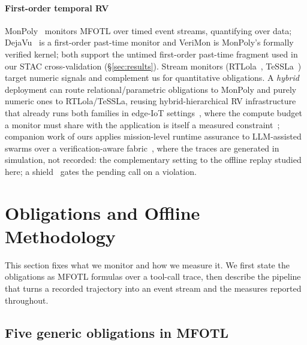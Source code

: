 \documentclass[sigconf]{acmart}
\begin{document}
\paragraph{First-order temporal RV} MonPoly~\cite{monpoly2014} monitors MFOTL over
timed event streams, quantifying over data;
DejaVu~\cite{havelund2018dejavu} is a first-order past-time monitor and VeriMon is
MonPoly's formally verified kernel; both support the untimed first-order past-time
fragment used in our STAC cross-validation (\S\ref{sec:results}).
Stream monitors (RTLola~\cite{rtlola2019}, TeSSLa~\cite{tessla2018}) target numeric
signals and complement us for quantitative obligations. A \emph{hybrid} deployment
can route relational/parametric obligations to MonPoly and purely numeric ones to
RTLola/TeSSLa, reusing hybrid-hierarchical RV infrastructure that already runs both
families in edge-IoT settings~\cite{hybridhier2025,hiermon2026,critisfabric2026}, where
the compute budget a monitor must share with the application is itself a measured
constraint~\cite{v2xedge2026};
companion work of ours applies mission-level runtime assurance to LLM-assisted swarms
over a verification-aware fabric~\cite{mesasswarm2026}, where the traces are generated in
simulation, not recorded: the complementary setting to the offline replay
studied here; a
shield~\cite{shielding2018} gates the pending call on a violation.

\section{Obligations and Offline Methodology}
\label{sec:oblig}

This section fixes what we monitor and how we measure it. We first state the obligations
as MFOTL formulas over a tool-call trace, then describe the pipeline that turns a
recorded trajectory into an event stream and the measures reported throughout.

\subsection{Five generic obligations in MFOTL}
\end{document}
